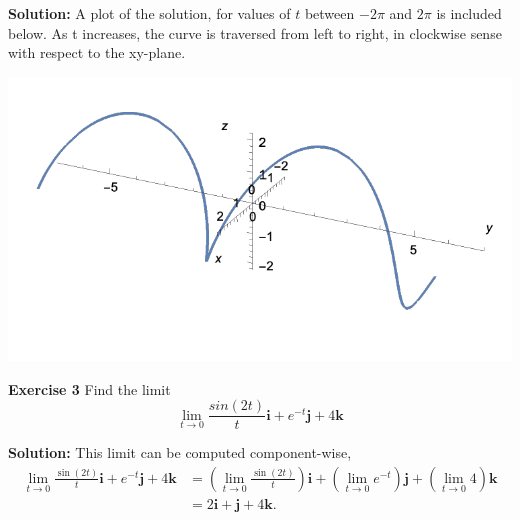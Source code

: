 \documentclass[12pt,oneside]{exam}
\newenvironment{exercise}[1]{\vspace{.1in}\noindent\textbf{Exercise #1 \hspace{.05em}}}{}
\newenvironment{newsolution}{\vspace{.1in}\noindent\textbf{Solution: \hspace{.05em}}}{}
\begin{document}
\begin{newsolution}
A plot of the solution, for values of $t$ between $-2\pi$ and $2\pi$ is included below. As t increases, the curve is traversed from left to right, in clockwise sense with respect to the xy-plane. 
\begin{center}
\includegraphics[scale=0.8]{p2.pdf}
\end{center}
\end{newsolution}


\begin{exercise}{3}
Find the limit
\begin{equation*}
\lim_{t \to 0} \frac{sin(2t)}{t}\mathbf{i} + e^{-t}\mathbf{j} + 4\mathbf{k}
\end{equation*}
\end{exercise}

\begin{newsolution}
This limit can be computed component-wise, 
\begin{align*}
\lim_{t \to 0} \frac{\sin(2t)}{t}\mathbf{i} + e^{-t}\mathbf{j} + 4\mathbf{k} & =  \left( \lim_{t \to 0} \frac{\sin(2t)}{t}\right) \mathbf{i} + \left( \lim_{t \to 0} e^{-t}\right) \mathbf{j} + \left( \lim_{t \to 0} 4\right) \mathbf{k} \\
& = 2\mathbf{i} + \mathbf{j} + 4\mathbf{k}.
\end{align*}
\end{newsolution} 
\end{document}
